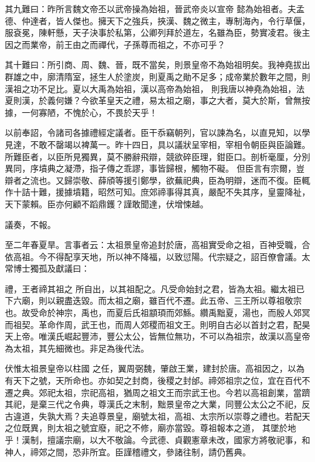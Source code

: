 \begin{pinyinscope}
 其九難曰：昨所言魏文帝丕以武帝操為始祖，晉武帝炎以宣帝
 懿為始祖者。夫孟德、仲達者，皆人傑也。擁天下之強兵，挾漢、魏之微主，專制海內，令行草偃，服袞冕，陳軒懸，天子決事於私第，公卿列拜於道左，名雖為臣，勢實凌君。後主因之而業帝，前王由之而禪代，子孫尊而祖之，不亦可乎？



 其十難曰：所引商、周、魏、晉，既不當矣，則景皇帝不為始祖明矣。我神堯拔出群雄之中，廓清隋室，拯生人於塗炭，則夏禹之勛不足多；成帝業於數年之間，則漢祖之功不足比。夏以大禹為始祖，漢以高帝為始祖，
 則我唐以神堯為始祖，法夏則漢，於義何嫌？今欲革皇天之禮，易太祖之廟，事之大者，莫大於斯，曾無按據，一何寡陋，不愧於心，不畏於天乎！



 以前奉詔，令諸司各據禮經定議者。臣干忝竊朝列，官以諫為名，以直見知，以學見達，不敢不罄竭以裨萬一。昨十四日，具以議狀呈宰相，宰相令朝臣與臣論難。所難臣者，以臣所見獨異，莫不勝辭飛辯，競欲碎臣理，鉗臣口。剖析毫厘，分別異同，序墳典之凝滯，指子傳之乖謬，事皆歸根，觸物不礙。
 但臣言有宗爾，豈辯者之流也。又歸崇敬、薛頎等援引鄭學，欲蕪祀典，臣為明辯，迷而不復。臣輒作十詰十難，援據墳籍，昭然可知。庶郊禘事得其真，嚴配不失其序，皇靈降祉，天下蒙賴。臣亦何顧不蹈鼎鑊？謹敢聞達，伏增悚越。



 議奏，不報。



 至二年春夏旱。言事者云：太祖景皇帝追封於唐，高祖實受命之祖，百神受職，合依高祖。今不得配享天地，所以神不降福，以致愆陽。代宗疑之，詔百僚會議。太常博士獨孤及獻議曰：



 禮，王者禘其祖之
 所自出，以其祖配之。凡受命始封之君，皆為太祖。繼太祖已下六廟，則以親盡迭毀。而太祖之廟，雖百代不遷。此五帝、三王所以尊祖敬宗也。故受命於神宗，禹也，而夏后氏祖顓頊而郊鯀。纘禹黜夏，湯也，而殷人郊冥而祖契。革命作周，武王也，而周人郊稷而祖文王。則明自古必以首封之君，配昊天上帝。唯漢氏崛起豐沛，豐公太公，皆無位無功，不可以為祖宗，故漢以高皇帝為太祖，其先細微也。非足為後代法。



 伏惟太祖景皇帝以柱國
 之任，翼周弼魏，肇啟王業，建封於唐。高祖因之，以為有天下之號，天所命也。亦如契之封商，後稷之封邰。禘郊祖宗之位，宜在百代不遷之典。郊祀太祖，宗祀高祖，猶周之祖文王而宗武王也。今若以高祖創業，當躋其祀，是棄三代之令典，尊漢氏之末制，黜景皇帝之大業，同豐公太公之不祀，反古違道，失孰大焉？夫追尊景皇，廟號太祖，高祖、太宗所以崇尊之禮也。若配天之位既異，則太祖之號宜廢，祀之不修，廟亦當毀。尊祖報本之道，
 其墜於地乎！漢制，擅議宗廟，以大不敬論。今武德、貞觀憲章未改，國家方將敬祀事，和神人，禘郊之間，恐非所宜。臣謹稽禮文，參諸往制，請仍舊典。




\end{pinyinscope}
